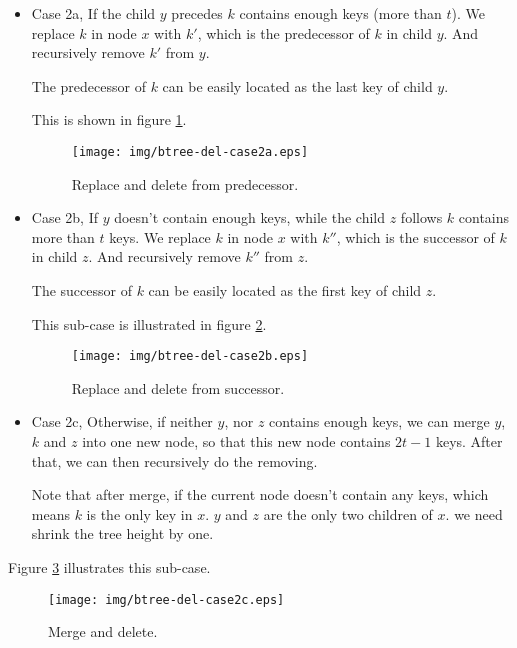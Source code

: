 \documentclass{article}
\begin{document}
\begin{itemize}
\item Case 2a, If the child $y$ precedes $k$ contains enough keys (more than $t$).
We replace $k$ in node $x$ with $k'$, which is
the predecessor of $k$ in child $y$. And recursively remove $k'$
from $y$.

The predecessor of $k$ can be easily located as the last key of child
$y$.

This is shown in figure \ref{fig:btree-del-case2a}.

\begin{figure}[htbp]
  \centering
    \texttt{[image: img/btree-del-case2a.eps]}
    \caption{Replace and delete from predecessor.} \label{fig:btree-del-case2a}
\end{figure}

\item Case 2b, If $y$ doesn't contain enough keys, while the child $z$
follows $k$ contains more than $t$ keys. We replace $k$ in node $x$
with $k''$, which is the successor of $k$ in child $z$. And recursively
remove $k''$ from $z$.

The successor of $k$ can be easily located as the first key of child $z$.

This sub-case is illustrated in figure \ref{fig:btree-del-case2b}.

\begin{figure}[htbp]
  \centering
    \texttt{[image: img/btree-del-case2b.eps]}
    \caption{Replace and delete from successor.} \label{fig:btree-del-case2b}
\end{figure}

\item Case 2c, Otherwise, if neither $y$, nor $z$ contains enough keys, we
can merge $y$, $k$ and $z$ into one new node, so that this new node
contains $2t-1$ keys. After that, we can then recursively do the removing.

Note that after merge, if the current node doesn't contain any keys,
which means $k$ is the only key in $x$. $y$ and $z$ are the only two
children of $x$. we need shrink the tree height by one.
\end{itemize}

Figure \ref{fig:btree-del-case2c} illustrates this sub-case.

\begin{figure}[htbp]
  \centering
    \texttt{[image: img/btree-del-case2c.eps]}
    \caption{Merge and delete.} \label{fig:btree-del-case2c}
\end{figure}
\end{document}
